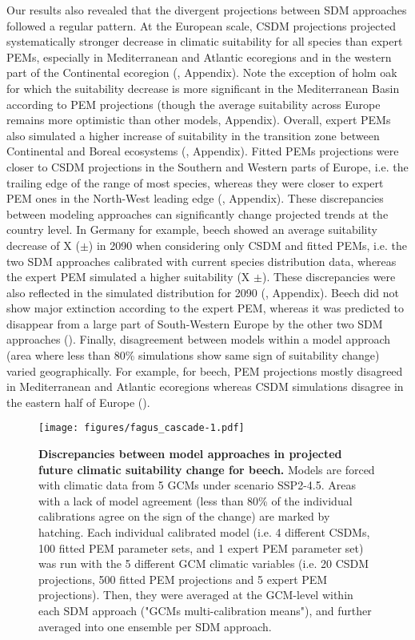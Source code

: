 \documentclass[letterpaper,8pt]{extarticle}  %
\begin{document}
\begin{doublespacing}
\begin{linenumbers}
Our results also revealed that the divergent projections between SDM approaches followed a regular pattern. 
At the European scale, CSDM projections projected systematically stronger decrease in climatic suitability for all species than expert PEMs, especially in Mediterranean and Atlantic ecoregions and in the western part of the Continental ecoregion (, Appendix). Note the exception of holm oak for which the suitability decrease is more significant in the Mediterranean Basin according to PEM projections (though the average suitability across Europe remains more optimistic than other models, Appendix). Overall, expert PEMs also simulated a higher increase of suitability in the transition zone between Continental and Boreal ecosystems (, Appendix). Fitted PEMs  projections were closer to CSDM projections in the Southern and Western parts of Europe, i.e. the trailing edge of the range of most species, whereas they were closer to expert PEM ones in the North-West leading edge (, Appendix). These discrepancies between modeling approaches can significantly change projected trends at the country level. In Germany for example, beech showed an average suitability decrease of X ($\pm$) in 2090 when considering only CSDM and fitted PEMs, i.e. the two SDM approaches calibrated with current species distribution data, whereas the expert PEM simulated a higher suitability (X $\pm$). These discrepancies were also reflected in the simulated distribution for 2090 (, Appendix). Beech did not show major extinction according to the expert PEM, whereas it was predicted to disappear from a large part of South-Western Europe by the other two SDM approaches (). Finally, disagreement between models within a model approach (area where less than 80\% simulations show same sign of suitability change) varied geographically. For example, for beech, PEM projections mostly  disagreed in Mediterranean and Atlantic ecoregions whereas CSDM simulations disagree in the eastern half of Europe ().

\begin{figure}

\centering
\texttt{[image: figures/fagus\_cascade-1.pdf]}
\caption{\textbf{Discrepancies between model approaches in projected future climatic suitability change for beech.} Models are forced with climatic data from 5 GCMs under scenario SSP2-4.5. Areas with a lack of model agreement (less than 80\% of the individual calibrations agree on the sign of the change) are marked by hatching. Each individual calibrated model (i.e. 4 different CSDMs, 100 fitted PEM parameter sets, and 1 expert PEM parameter set) was run with the 5 different GCM climatic variables (i.e. 20 CSDM projections, 500 fitted PEM projections and 5 expert PEM projections). Then, they were averaged at the GCM-level within each SDM approach ("GCMs multi-calibration means"), and further averaged into one ensemble per SDM approach.}
\label{fig:cascade}
\end{figure}


\end{linenumbers}
\end{doublespacing}
\end{document}
